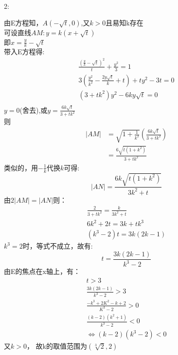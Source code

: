 \documentclass[UTF8]{ctexart}
\begin{document}
2:\par
由E方程知，$A(-\sqrt{t},0)$,又$k>0$且易知k存在\\
可设直线$AM:y=k(x+\sqrt{t})$\\
即$x=\frac{y}{k}-\sqrt{t}$\\
带入E方程得:
\[\begin{aligned}
        \frac{(\frac{y}{k}-\sqrt{t})^2}{t}+\frac{y^2}{3}=1  \\
        3(\frac{y^2}{k^2}-\frac{2y\sqrt{t}}{k}+t)+ty^2-3t=0 \\
        (3+tk^2)y^2-6ky\sqrt{t}=0                           \\
    \end{aligned}\]
$y=0$(舍去),或$y=\frac{6k\sqrt{t}}{3+tk^2}$\\
则$$\begin{aligned}
        |AM| & =\sqrt{1+\frac{1}{k^2}}(\frac{6k\sqrt{t}}{3+tk^2}) \\
             & =\frac{6\sqrt{t(1+k^2)}}{3+tk^2}
    \end{aligned}$$
类似的，用$-\frac{1}{k}$代换$k$可得:\\
\[|AN|=\frac{6k\sqrt{t(1+k^2)}}{3k^2+t} \]
由$2|AM|=|AN|$则：
\[\begin{aligned}
        \frac{2}{3+tk^2}=\frac{k}{3k^2+t} \\
        6k^2+2t=3k+tk^3                   \\
        (k^3-2)t=3k(2k-1)
    \end{aligned}  \]
$k^3=2$时，等式不成立，故有:
\[t=\frac{3k(2k-1)}{k^3-2}  \]
由E的焦点在x轴上，有：
\[\begin{aligned}
        t>3                           \\
        \frac{3k(2k-1)}{k^3-2} >3     \\
        \frac{-k^3+2K^2-k+2}{K^3-2}>0 \\
        \frac{(k-2)(k^2+1)}{k^3-2}<0  \\
        \Leftrightarrow (k-2)(k^3-2)<0
    \end{aligned}\]
又$k>0$，
故k的取值范围为$(\sqrt[3]{2},2)$
\end{document}
